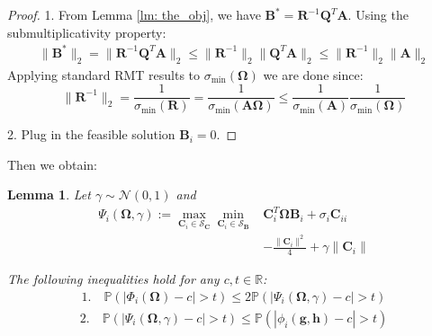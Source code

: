 \documentclass[conference]{IEEEtran}
\newcommand{\bOmega}{\bm{\Omega}}
\newcommand{\bA}{\mathbf{A}}
\newcommand{\bB}{\mathbf{B}}
\newcommand{\bC}{\mathbf{C}}
\newcommand{\bI}{\mathbf{I}}
\newcommand{\bQ}{\mathbf{Q}}
\newcommand{\bR}{\mathbf{R}}
\newcommand{\calS}{\mathcal{S}}
\newtheorem{lemma}{Lemma}
\begin{document}
\begin{proof}
1. From Lemma \ref{lm: the_obj}, we have $\bB^* = \bR^{-1}\bQ^T\bA$. Using the submultiplicativity property:
\begin{align*}
     \|\bB^*\|_{2} = \|\bR^{-1}\bQ^T\bA\|_{2} \leq \|\bR^{-1}\|_{2} \|\bQ^T\bA\|_{2} \leq \|\bR^{-1}\|_2 \|\bA\|_2 
\end{align*}
Applying standard RMT results to $\sigma_{\min}(\bOmega)$ we are done since:
$$\|\bR^{-1}\|_2 = \frac{1}{\sigma_{\min}(\bR)} = \frac{1}{\sigma_{\min}(\bA\bOmega)} \le \frac{1}{\sigma_{\min}(\bA)}\frac{1}{\sigma_{\min}(\bOmega)}$$


2. Plug in the feasible solution $\mathbf{B}_i = 0$.

\end{proof}
Then we obtain:
\begin{lemma}\label{lemma: po_ao_comparison}
Let $ \gamma \sim \mathcal{N}(0,1)$ and
\begin{align*}
    \Psi_i(\bOmega, \gamma) := \max_{\mathbf{C}_i \in \calS_{\bC}} \min_{\mathbf{C}_i \in \calS_{\bB}} & \mathbf{C}_i^T \boldsymbol{\Omega} \mathbf{B}_i + \sigma_i\mathbf{C}_{ii} \\
    & - \frac{\|\mathbf{C}_i\|^2}{4} + \gamma\|\bC_i\| 
\end{align*}

The following inequalities hold for any $c, t \in \mathbb{R}$:
\begin{align*}
1. \quad \mathbb{P} \left(| \Phi_i(\bOmega) - c| > t \right) \le 2 \mathbb{P}\left(|\Psi_i(\bOmega, \gamma) - c| > t \right)        
\end{align*}
 \begin{align*} 2. \quad
\mathbb{P}\left(|\Psi_i(\bOmega, \gamma) - c| > t \right) \le \mathbb{P}\left(|\phi_i(\mathbf{g}, \mathbf{h}) - c| > t \right)        
\end{align*}
\end{lemma}
\end{document}
